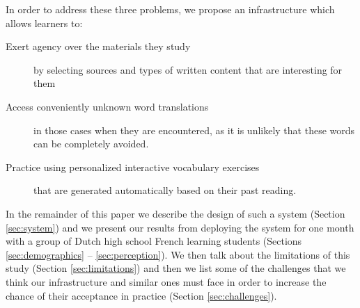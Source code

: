 In order to address these three problems, we propose an infrastructure which allows learners to: 

	\begin{description}
	
		\item [Exert agency over the materials they study] by selecting sources and types of written content that are interesting for them
	
		\item [Access conveniently unknown word translations] in those cases when they are encountered, as it is unlikely that these words can be completely avoided.

		\item [Practice using personalized interactive vocabulary exercises] that are generated automatically based on their past reading.

	\end{description}


In the remainder of this paper we describe the design of such a system (Section \ref{sec:system}) and we present our results from deploying the system for one month with a group of \students Dutch high school French learning students (Sections \ref{sec:demographics} -- \ref{sec:perception}). We then talk about the limitations of this study (Section \ref{sec:limitations}) and then we list some of the challenges that we think our infrastructure and similar ones must face in order to increase the chance of their acceptance in practice (Section \ref{sec:challenges}).

